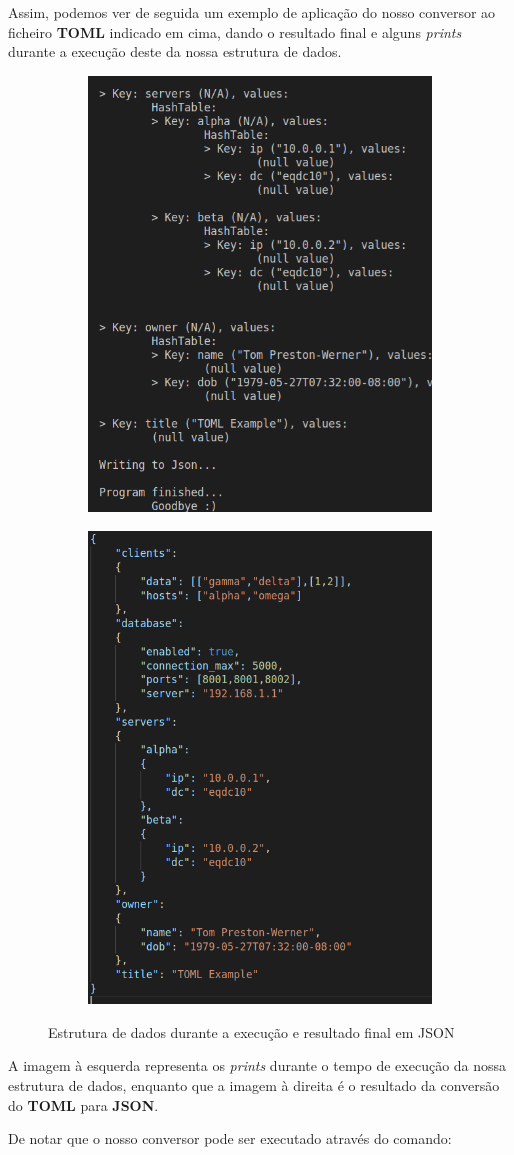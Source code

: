 \documentclass[a4paper,12pt]{report}
\begin{document}
\par Assim, podemos ver de seguida um exemplo de aplicação do nosso conversor ao ficheiro \textbf{TOML} indicado em cima, dando o resultado final e alguns \textit{prints} durante a execução deste da nossa estrutura de dados.




\begin{figure}[H]
\centering
\begin{subfigure}
  \centering
  \includegraphics[width=.45\linewidth]{images/Prints em Exec.png}
  \label{fig:sub1}
\end{subfigure}
\begin{subfigure}
  \centering
  \includegraphics[width=.45\linewidth]{images/Json final Ex1.png}
  \label{fig:sub2}
\end{subfigure}
\caption{Estrutura de dados durante a execução e resultado final em JSON}
\label{fig:test}
\end{figure}

\par A imagem à esquerda representa os \textit{prints} durante o tempo de execução da nossa estrutura de dados, enquanto que a imagem à direita é o resultado da conversão do \textbf{TOML} para \textbf{JSON}.
\par De notar que o nosso conversor pode ser executado através do comando:
\end{document}
